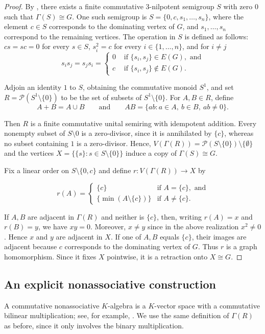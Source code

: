 \documentclass[a4paper,11pt]{amsart}
\theoremstyle{definition}
\begin{document}
\semiring*
\begin{proof}
By \cite[Theorem~3]{DD05}, there exists a finite commutative
$3$-nilpotent semigroup $S$ with zero $0$ such that $
\Gamma(S)\cong G$. One such semigroup is  $S = \{0,c,s_1,\ldots,s_n\}$, where the element $c\in S$ corresponds to the dominating
vertex of $G$, and $s_1,\dots,s_n$ correspond to the remaining vertices. The operation in $S$ is defined as follows: $cs=sc=0$ for every $s\in S$, $s_i^2=c$ for every $i\in\{1,\dots,n\}$, and for $i\neq j$ \[
s_is_j=s_js_i=\begin{cases}
    0 & \text{ if }\{s_i,s_j\}\in E(G), \text{ and}\\
    c & \text{ if }\{s_i,s_j\}\notin E(G).
\end{cases}
\]


Adjoin an identity $1$ to $S$, obtaining the commutative monoid $S^1$, and set $R=\mathcal P(S^1\setminus\{0\})$ to be the set of subsets of $S^1\setminus\{0\}$. 
For $A,B\in R$, define
$$
A+B=A\cup B
\qquad\text{and}\qquad
AB=\{ab:a\in A,\ b\in B,\ ab\neq0\}.
$$


Then $R$ is a finite commutative unital semiring with idempotent addition.
Every nonempty subset of $S\setminus{0}$ is a zero-divisor, since it is
annihilated by $\{c\}$, whereas no subset containing $1$ is a zero-divisor.
Hence, $
V(\Gamma(R))
=
\mathcal P(S\setminus\{0\})\setminus\{\emptyset\}
$ and the vertices $
X=\bigl\{\{s\}:s\in S\setminus\{0\}\bigr\}
$ induce a copy of $\Gamma(S)\cong G$.

Fix a linear order on $S\setminus\{0,c\}$ and define $
r:V(\Gamma(R))\rightarrow X
$ by

$$
r(A)=
\begin{cases}
\{c\}&\text{if }A=\{c\},\text{ and}\\
\{\min(A\setminus\{c\})\}&\text{if }A\neq\{c\}.
\end{cases}
$$

If $A, B$ are adjacent in $\Gamma(R)$ and neither is $\{c\}$, then, writing
$r(A)={x}$ and $r(B)={y}$, we have $xy=0$.  Moreover, $x\neq y$ since
in the above realization $x^2\neq0$.  Hence ${x}$ and ${y}$ are adjacent
in $X$.  If one of $A,B$ equals $\{c\}$, their images are adjacent because
$c$ corresponds to the dominating vertex of $G$.  Thus $r$ is a graph
homomorphism.  Since it fixes $X$ pointwise, it is a retraction onto
$X\cong G$.
\end{proof}

\subsection{An explicit nonassociative construction}\label{subsec:free-nonassoc}
A commutative
nonassociative $K$-algebra is a $K$-vector space with a commutative bilinear
multiplication; see, for example, \cite{Schafer66}.  We use the same
definition of $\Gamma(R)$ as before, since it only involves the binary multiplication.
\end{document}
